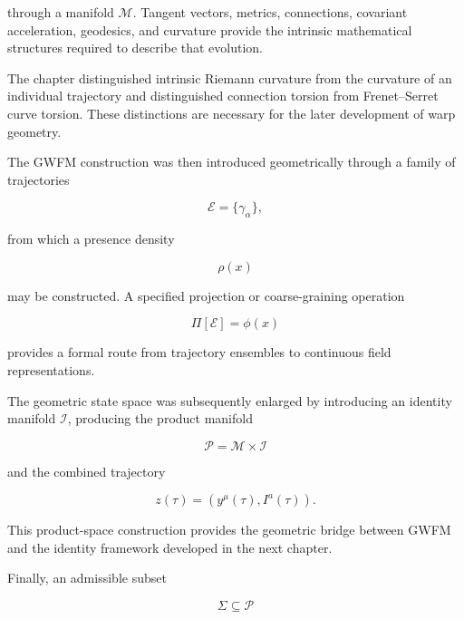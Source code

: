 \documentclass[12pt,oneside]{book}
\begin{document}
through a manifold \(\mathcal{M}\). Tangent vectors, metrics,
connections, covariant acceleration, geodesics, and curvature
provide the intrinsic mathematical structures required to
describe that evolution.

The chapter distinguished intrinsic Riemann curvature from the
curvature of an individual trajectory and distinguished
connection torsion from Frenet--Serret curve torsion. These
distinctions are necessary for the later development of warp
geometry.

The GWFM construction was then introduced geometrically through
a family of trajectories

\begin{equation}
    \mathscr{E}
    =
    \{\gamma_\alpha\},
\end{equation}

from which a presence density

\begin{equation}
    \rho(x)
\end{equation}

may be constructed. A specified projection or coarse-graining
operation

\begin{equation}
    \Pi[\mathscr{E}]
    =
    \phi(x)
\end{equation}

provides a formal route from trajectory ensembles to continuous
field representations.

The geometric state space was subsequently enlarged by
introducing an identity manifold \(\mathcal{I}\), producing the
product manifold

\begin{equation}
    \mathcal{P}
    =
    \mathcal{M}
    \times
    \mathcal{I}
\end{equation}

and the combined trajectory

\begin{equation}
    z(\tau)
    =
    \left(
        y^\mu(\tau),
        I^a(\tau)
    \right).
\end{equation}

This product-space construction provides the geometric bridge
between GWFM and the identity framework developed in the next
chapter.

Finally, an admissible subset

\begin{equation}
    \Sigma
    \subseteq
    \mathcal{P}
\end{equation}
\end{document}
